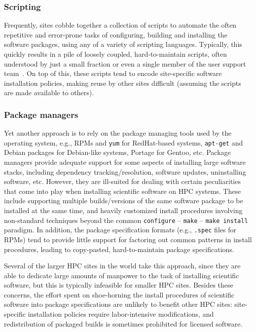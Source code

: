 \subsubsection{Scripting}

Frequently, sites cobble together a collection of scripts to automate the often repetitive and error-prone tasks of
configuring, building and installing the software packages, using any of a variety of scripting languages. Typically, this quickly results in a pile of
loosely coupled, hard-to-maintain scripts, often
understood by just a small fraction or even a single member of the user support
team~\cite{Jim}. On top of this, these
scripts tend to encode site-specific software installation policies, making reuse by other sites difficult (assuming the scripts
are made available to others).

\subsubsection{Package managers}

Yet another approach is to rely on the package managing tools used
by the operating system, e.g., RPMs and \texttt{\small yum} for RedHat-based systems,
\texttt{\small apt-get} and Debian packages for Debian-like systems, Portage for
Gentoo, etc.
Package managers provide adequate support for some aspects of
installing large software stacks, including dependency tracking/resolution, software
updates, uninstalling software, etc. However, they are ill-suited for dealing with
certain peculiarities that come into play when installing scientific software on
HPC systems. These include supporting multiple builds/versions of the same software package
to be installed at the same time, and heavily customized install procedures involving
non-standard techniques beyond the common \texttt{\small configure} --
\texttt{\small make} -- \texttt{\small make install} paradigm. In addition, the package specification formats (e.g.,
\texttt{\small .spec} files for RPMs) tend to provide little support for factoring out
common patterns in install procedures, leading to copy-pasted, hard-to-maintain package specifications.

Several of the larger HPC sites in the world take this approach, since they are able to dedicate large amounts of manpower to
the task of installing scientific software, but this is typically infeasible for
smaller HPC sites. Besides these concerns, the effort spent on
shoe-horning the install procedures of scientific software into package
specifications are unlikely to benefit other HPC sites: 
site-specific installation policies require labor-intensive modifications, and
redistribution of packaged builds is sometimes prohibited for
licensed software.


